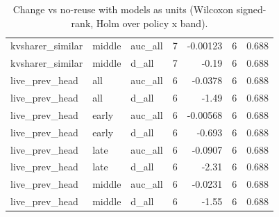 \begin{table}[t]
\begin{tabular}{lllrrrr}
kvsharer\_similar & middle & auc\_all & 7 & -0.00123 & 6 & 0.688 \\
kvsharer\_similar & middle & d\_all & 7 & -0.19 & 6 & 0.688 \\
live\_prev\_head & all & auc\_all & 6 & -0.0378 & 6 & 0.688 \\
live\_prev\_head & all & d\_all & 6 & -1.49 & 6 & 0.688 \\
live\_prev\_head & early & auc\_all & 6 & -0.00568 & 6 & 0.688 \\
live\_prev\_head & early & d\_all & 6 & -0.693 & 6 & 0.688 \\
live\_prev\_head & late & auc\_all & 6 & -0.0907 & 6 & 0.688 \\
live\_prev\_head & late & d\_all & 6 & -2.31 & 6 & 0.688 \\
live\_prev\_head & middle & auc\_all & 6 & -0.0231 & 6 & 0.688 \\
live\_prev\_head & middle & d\_all & 6 & -1.55 & 6 & 0.688 \\
\bottomrule
\end{tabular}
\caption{Change vs no-reuse with models as units (Wilcoxon signed-rank, Holm over policy x band).}
\label{tab:models_as_units}
\end{table}
